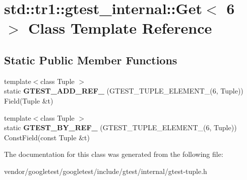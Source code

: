 \hypertarget{classstd_1_1tr1_1_1gtest__internal_1_1Get_3_016_01_4}{}\section{std\+:\+:tr1\+:\+:gtest\+\_\+internal\+:\+:Get$<$ 6 $>$ Class Template Reference}
\label{classstd_1_1tr1_1_1gtest__internal_1_1Get_3_016_01_4}
\subsection*{Static Public Member Functions}
\begin{DoxyCompactItemize}
\item 
{\footnotesize template$<$class Tuple $>$ }\\static {\bfseries G\+T\+E\+S\+T\+\_\+\+A\+D\+D\+\_\+\+R\+E\+F\+\_\+} (G\+T\+E\+S\+T\+\_\+\+T\+U\+P\+L\+E\+\_\+\+E\+L\+E\+M\+E\+N\+T\+\_\+(6, Tuple)) Field(Tuple \&t)\hypertarget{classstd_1_1tr1_1_1gtest__internal_1_1Get_3_016_01_4_a28034152d066c8644fa55e9fc0e3a12d}{}\label{classstd_1_1tr1_1_1gtest__internal_1_1Get_3_016_01_4_a28034152d066c8644fa55e9fc0e3a12d}

\item 
{\footnotesize template$<$class Tuple $>$ }\\static {\bfseries G\+T\+E\+S\+T\+\_\+\+B\+Y\+\_\+\+R\+E\+F\+\_\+} (G\+T\+E\+S\+T\+\_\+\+T\+U\+P\+L\+E\+\_\+\+E\+L\+E\+M\+E\+N\+T\+\_\+(6, Tuple)) Const\+Field(const Tuple \&t)\hypertarget{classstd_1_1tr1_1_1gtest__internal_1_1Get_3_016_01_4_a6e396b998757e0ab9b75db0c68a7c360}{}\label{classstd_1_1tr1_1_1gtest__internal_1_1Get_3_016_01_4_a6e396b998757e0ab9b75db0c68a7c360}

\end{DoxyCompactItemize}


The documentation for this class was generated from the following file\+:\begin{DoxyCompactItemize}
\item 
vendor/googletest/googletest/include/gtest/internal/gtest-\/tuple.\+h\end{DoxyCompactItemize}
